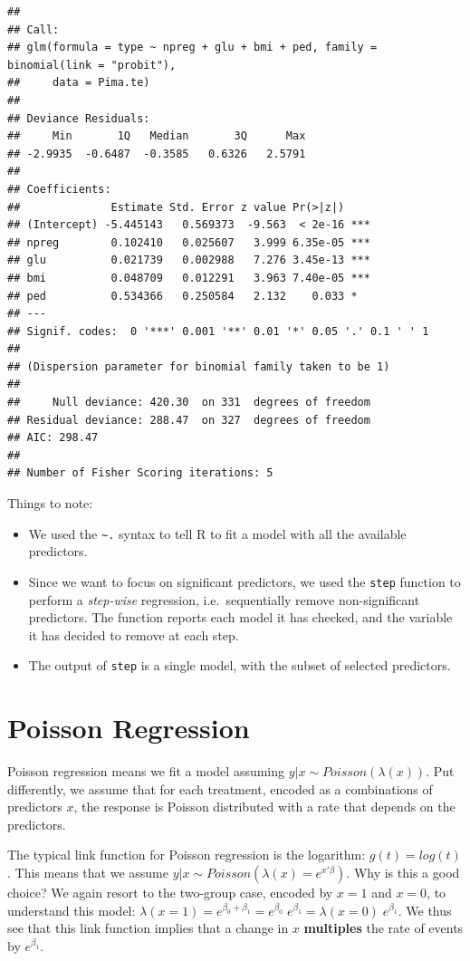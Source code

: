 \documentclass[]{book}
\providecommand{\tightlist}{%
  \setlength{\itemsep}{0pt}\setlength{\parskip}{0pt}}
\theoremstyle{definition}
\theoremstyle{definition}
\theoremstyle{definition}
\theoremstyle{remark}
\begin{document}
\begin{verbatim}
## 
## Call:
## glm(formula = type ~ npreg + glu + bmi + ped, family = binomial(link = "probit"), 
##     data = Pima.te)
## 
## Deviance Residuals: 
##     Min       1Q   Median       3Q      Max  
## -2.9935  -0.6487  -0.3585   0.6326   2.5791  
## 
## Coefficients:
##              Estimate Std. Error z value Pr(>|z|)    
## (Intercept) -5.445143   0.569373  -9.563  < 2e-16 ***
## npreg        0.102410   0.025607   3.999 6.35e-05 ***
## glu          0.021739   0.002988   7.276 3.45e-13 ***
## bmi          0.048709   0.012291   3.963 7.40e-05 ***
## ped          0.534366   0.250584   2.132    0.033 *  
## ---
## Signif. codes:  0 '***' 0.001 '**' 0.01 '*' 0.05 '.' 0.1 ' ' 1
## 
## (Dispersion parameter for binomial family taken to be 1)
## 
##     Null deviance: 420.30  on 331  degrees of freedom
## Residual deviance: 288.47  on 327  degrees of freedom
## AIC: 298.47
## 
## Number of Fisher Scoring iterations: 5
\end{verbatim}

Things to note:

\begin{itemize}
\tightlist
\item
  We used the \texttt{\textasciitilde{}.} syntax to tell R to fit a
  model with all the available predictors.
\item
  Since we want to focus on significant predictors, we used the
  \texttt{step} function to perform a \emph{step-wise} regression,
  i.e.~sequentially remove non-significant predictors. The function
  reports each model it has checked, and the variable it has decided to
  remove at each step.
\item
  The output of \texttt{step} is a single model, with the subset of
  selected predictors.
\end{itemize}

\section{Poisson Regression}\label{poisson-regression}

Poisson regression means we fit a model assuming
\(y|x \sim Poisson(\lambda(x))\). Put differently, we assume that for
each treatment, encoded as a combinations of predictors \(x\), the
response is Poisson distributed with a rate that depends on the
predictors.

The typical link function for Poisson regression is the logarithm:
\(g(t)=log(t)\). This means that we assume
\(y|x \sim Poisson(\lambda(x) = e^{x'\beta})\). Why is this a good
choice? We again resort to the two-group case, encoded by \(x=1\) and
\(x=0\), to understand this model:
\(\lambda(x=1)=e^{\beta_0+\beta_1}=e^{\beta_0} \; e^{\beta_1}= \lambda(x=0) \; e^{\beta_1}\).
We thus see that this link function implies that a change in \(x\)
\textbf{multiples} the rate of events by \(e^{\beta_1}\).
\end{document}
